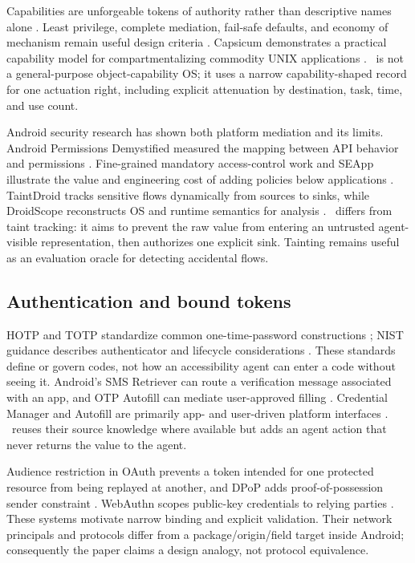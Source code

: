 Capabilities are unforgeable tokens of authority rather than descriptive names alone \cite{dennis1966semantics}. Least privilege, complete mediation, fail-safe defaults, and economy of mechanism remain useful design criteria \cite{saltzer1975protection}. Capsicum demonstrates a practical capability model for compartmentalizing commodity UNIX applications \cite{watson2010capsicum}. \SH\ is not a general-purpose object-capability OS; it uses a narrow capability-shaped record for one actuation right, including explicit attenuation by destination, task, time, and use count.

Android security research has shown both platform mediation and its limits. Android Permissions Demystified measured the mapping between API behavior and permissions \cite{felt2011permission}. Fine-grained mandatory access-control work and SEApp illustrate the value and engineering cost of adding policies below applications \cite{bugiel2013flexible,rossi2021seapp}. TaintDroid tracks sensitive flows dynamically from sources to sinks, while DroidScope reconstructs OS and runtime semantics for analysis \cite{enck2010taintdroid,yan2012droidscope}. \SH\ differs from taint tracking: it aims to prevent the raw value from entering an untrusted agent-visible representation, then authorizes one explicit sink. Tainting remains useful as an evaluation oracle for detecting accidental flows.

\subsection{Authentication and bound tokens}

HOTP and TOTP standardize common one-time-password constructions \cite{rfc4226,rfc6238}; NIST guidance describes authenticator and lifecycle considerations \cite{nist80063b}. These standards define or govern codes, not how an accessibility agent can enter a code without seeing it. Android's SMS Retriever can route a verification message associated with an app, and OTP Autofill can mediate user-approved filling \cite{androidSmsRetriever,androidAutofillServices}. Credential Manager and Autofill are primarily app- and user-driven platform interfaces \cite{androidCredentialManager,androidAutofill}. \SH\ reuses their source knowledge where available but adds an agent action that never returns the value to the agent.

Audience restriction in OAuth prevents a token intended for one protected resource from being replayed at another, and DPoP adds proof-of-possession sender constraint \cite{rfc8707,rfc9449,rfc9700}. WebAuthn scopes public-key credentials to relying parties \cite{webauthn3}. These systems motivate narrow binding and explicit validation. Their network principals and protocols differ from a package/origin/field target inside Android; consequently the paper claims a design analogy, not protocol equivalence.


